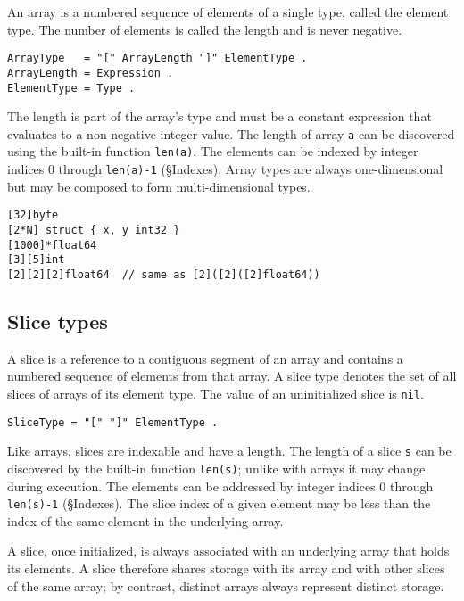 {An array is a numbered sequence of elements of a single type, called the
element type. The number of elements is called the length and is never
negative.

\begin{Verbatim}[frame=single]
ArrayType   = "[" ArrayLength "]" ElementType .
ArrayLength = Expression .
ElementType = Type .
\end{Verbatim}

The length is part of the array's type and must be a
constant expression that evaluates to
a non-negative integer value. The length of array \texttt{a} can be
discovered using the built-in function
\texttt{len(a)}. The elements can be
indexed by integer indices 0 through \texttt{len(a)-1}
(§Indexes). Array types are always one-dimensional
but may be composed to form multi-dimensional types.

\begin{Verbatim}[frame=single]
[32]byte
[2*N] struct { x, y int32 }
[1000]*float64
[3][5]int
[2][2][2]float64  // same as [2]([2]([2]float64))
\end{Verbatim}

\subsection*{Slice types}

A slice is a reference to a contiguous segment of an array and contains
a numbered sequence of elements from that array. A slice type denotes
the set of all slices of arrays of its element type. The value of an
uninitialized slice is \texttt{nil}.

\begin{Verbatim}[frame=single]
SliceType = "[" "]" ElementType .
\end{Verbatim}

Like arrays, slices are indexable and have a length. The length of a
slice \texttt{s} can be discovered by the built-in function
\texttt{len(s)}; unlike with arrays it
may change during execution. The elements can be addressed by integer
indices 0 through \texttt{len(s)-1} (§Indexes). The
slice index of a given element may be less than the index of the same
element in the underlying array.

A slice, once initialized, is always associated with an underlying array
that holds its elements. A slice therefore shares storage with its array
and with other slices of the same array; by contrast, distinct arrays
always represent distinct storage.

}
